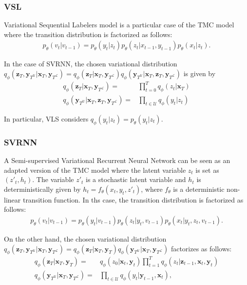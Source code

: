 \documentclass{article}
\def\x{{\mathbf x}}
\def\z{{\mathbf z}}
\def\y{{\mathbf y}}
\def\yl{{\mathbf y}_{T^{\mathcal{L}}}}
\def\yu{{\mathbf y}_{T^{\mathcal{U}}}}
\def\p{p_{\theta}}
\def\q{q_\phi}
\def\U{\mathcal{U}}
\begin{document}
\subsubsection{VSL}
Variational Sequential Labelers model is a particular case of the TMC model
where the transition distribution is factorized as follows:
\begin{align}
\label{eq:vsl}
\p(v_t|v_{t-1}) \!= \!\p(y_t|z_t) \p(z_t|x_{t-1}, y_{t-1}) \p(x_t|z_t) \text{.}
\end{align}

In the case of SVRNN, the chosen variational distribution
$\q(\z_T, \yu| \x_T, \yl\!) \!=\!  \q(\z_T| \x_T, \yl\!) \q(\yu| \x_T, \z_T, \yl \!)$ 
is given by
\begin{align*}  
    \q(\z_T| \x_T, \yl ) =& \prod_{t=0}^T \q(z_t| \x_T) \\
    \q(\yu| \x_T, \z_T, \yl ) =& \prod_{t\in  \U}  \q(y_t| z_t)
\end{align*}
 
In particular, VLS considers $\q(y_t| z_t) =  \p(y_t| z_t)$.

\subsubsection{SVRNN}
A Semi-supervised Variational Recurrent Neural Network can be seen as an adapted
version of the TMC model where the latent variable $z_t$ is set as
 $(z'_t, h_t)$. The variable $z'_t$ is a stochastic latent variable 
and $h_t$ is deterministically given by $h_t = f_{\theta}(x_t, y_t, z'_t)$, 
where $f_{\theta}$ is a deterministic non-linear transition function. 
In ths case, the transition distribution is factorized as follows:
\begin{align}
\label{eq:svrnn}
\p(v_t|v_{t-1}\!) \!= \!\p(y_t|v_{t-1}\!) \p(z_t|y_t,\! v_{t-1}\!) \p(x_t|y_t,z_t,\!v_{t-1}\!) \text{.}
\end{align}

On the other hand, the chosen variational distribution 
$\q(\z_T, \yu| \x_T, \yl) =  \q(\z_T| \x_T, \y_T ) \q(\yu| \x_T, \yl )$  
factorizes as follows:
\begin{align*}
\q(\z_T| \x_T, \y_T ) =&  \q(z_0|\x_t, \y_t) \prod_{t=1}^T \q(z_t|\z_{t-1},\x_t, \y_t)  \\
\q(\yu| \x_T, \yl )=& \prod_{t\in  \U} \q(y_t|\y_{t-1}, \x_t) \text{,}
\end{align*}
\end{document}
